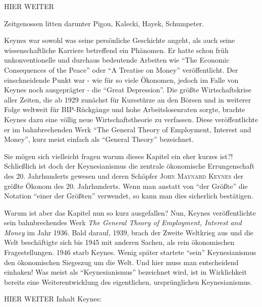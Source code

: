 HIER WEITER







Zeitgenossen litten darunter Pigou, Kalecki, Hayek, Schumpeter. 








Keynes war sowohl was seine persönliche Geschichte angeht, als auch seine wissenschaftliche Karriere betreffend ein Phänomen. Er hatte schon früh unkonventionelle und durchaus bedeutende Arbeiten wie \textcite{Keynes1919} "`The Economic Consequences of the Peace"' oder \textcite{Keynes1930} "`A Treatise on Money"' veröffentlicht. Der einschneidende Punkt war - wie für so viele Ökonomen, jedoch im Falle von Keynes noch ausgeprägter - die "`Great Depression"'. Die größte Wirtschaftskrise aller Zeiten,  die ab 1929 zunächst für Kursstürze an den Börsen und in weiterer Folge weltweit für BIP-Rückgänge und hohe Arbeitslosenraten sorgte, brachte Keynes dazu eine völlig neue Wirtschaftstheorie zu verfassen. Diese veröffentlichte er im bahnbrechenden Werk \textcite{Keynes1936} "`The General Theory of Employment, Interest and Money"', kurz meist einfach als "`General Theory"' bezeichnet. 








Sie mögen sich vielleicht fragen warum dieses Kapitel ein eher kurzes ist?! Schließlich ist doch der Keynesianismus die zentrale ökonomische Errungenschaft des 20. Jahrhunderts gewesen und deren Schöpfer \textsc{John Maynard Keynes} der größte Ökonom des 20. Jahrhunderts. Wenn man anstatt von "`der Größte"' die Notation "`einer der Größten"' verwendet, so kann man dies sicherlich bestätigen.

Warum ist aber das Kapitel nun so kurz ausgefallen? Nun, Keynes veröffentlichte sein bahnbrechendes Werk \textit{The General Theory of Employment, Interest and Money} im Jahr 1936. Bald darauf, 1939, brach der Zweite Weltkrieg aus und die Welt beschäftigte sich bis 1945 mit anderen Sachen, als rein ökonomischen Fragestellungen. 1946 starb Keynes. Wenig später startete "`sein"' Keynesianismus den ökonomischen Siegeszug um die Welt. Und hier muss man entscheidend einhaken! Was meist als "`Keynesianismus"' bezeichnet wird, ist in Wirklichkeit bereits eine Weiterentwicklung des eigentlichen, ursprünglichen Keynesianismus.

HIER WEITER
Inhalt Keynes:

